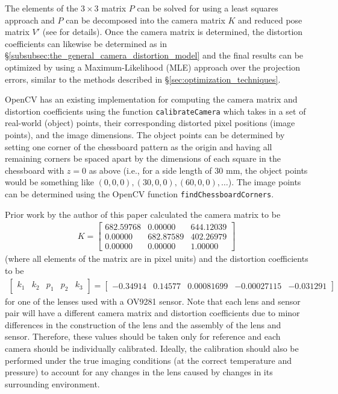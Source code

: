 \documentclass[11pt, letterpaper]{extarticle} %
\begin{document}
The elements of the $3 \times 3$ matrix $P$ can be solved for using a least squares approach and $P$ can be decomposed into the camera matrix $K$ and reduced pose matrix $V'$ (see \cite{zhang2000flexible} for details). Once the camera matrix is determined, the distortion coefficients can likewise be determined as in \S\ref{subsubsec:the_general_camera_distortion_model} and the final results can be optimized by using a Maximum-Likelihood (MLE) approach over the projection errors, similar to the methods described in \S\ref{sec:optimization_techniques}.

OpenCV has an existing implementation for computing the camera matrix and distortion coefficients using the function \verb|calibrateCamera| which takes in a set of real-world (object) points, their corresponding distorted pixel positions (image points), and the image dimensions. The object points can be determined by setting one corner of the chessboard pattern as the origin and having all remaining corners be spaced apart by the dimensions of each square in the chessboard with $z=0$ as above (i.e., for a side length of 30 mm, the object points would be something like $(0, 0, 0), (30, 0, 0), (60, 0, 0), \ldots$). The image points can be determined using the OpenCV function \verb|findChessboardCorners|. 

Prior work by the author of this paper calculated the camera matrix to be 
\begin{align}
    K = 
    \begin{bmatrix}
        682.59768 & 0.00000 & 644.12039 \\
        0.00000 & 682.87589 & 402.26979 \\
        0.00000 & 0.00000 & 1.00000
    \end{bmatrix}
\end{align}
(where all elements of the matrix are in pixel units) and the distortion coefficients to be
\begin{align}
    \begin{bmatrix}
        k_1 & k_2 & p_1 & p_2 & k_3
    \end{bmatrix}
    =
    \begin{bmatrix}
        -0.34914 & 0.14577 & 0.00081699 & -0.00027115 & -0.031291
    \end{bmatrix}
\end{align}
for one of the lenses used with a OV9281 sensor. Note that each lens and sensor pair will have a different camera matrix and distortion coefficients due to minor differences in the construction of the lens and the assembly of the lens and sensor. Therefore, these values should be taken only for reference and each camera should be individually calibrated. Ideally, the calibration should also be performed under the true imaging conditions (at the correct temperature and pressure) to account for any changes in the lens caused by changes in its surrounding environment.
\end{document}
